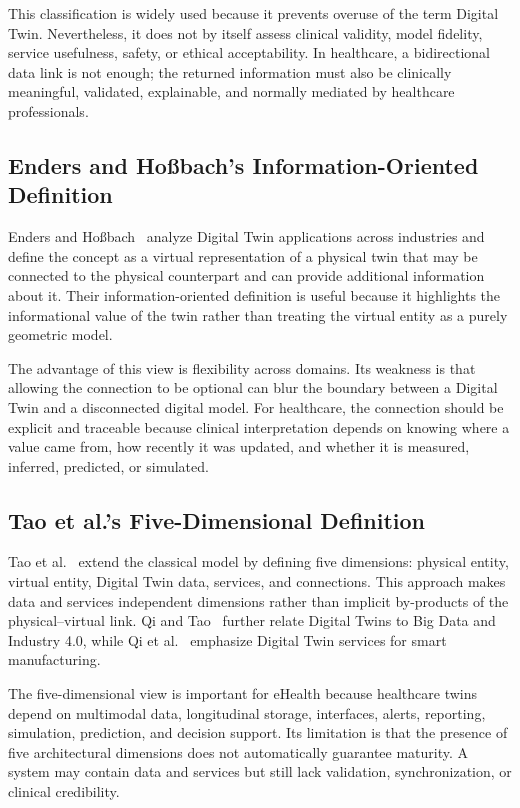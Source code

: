This classification is widely used because it prevents overuse of the term Digital Twin. Nevertheless, it does not by itself assess clinical validity, model fidelity, service usefulness, safety, or ethical acceptability. In healthcare, a bidirectional data link is not enough; the returned information must also be clinically meaningful, validated, explainable, and normally mediated by healthcare professionals.

\subsection{Enders and Ho{\ss}bach's Information-Oriented Definition}
Enders and Ho{\ss}bach~\cite{enders2019dimensions} analyze Digital Twin applications across industries and define the concept as a virtual representation of a physical twin that may be connected to the physical counterpart and can provide additional information about it. Their information-oriented definition is useful because it highlights the informational value of the twin rather than treating the virtual entity as a purely geometric model.

The advantage of this view is flexibility across domains. Its weakness is that allowing the connection to be optional can blur the boundary between a Digital Twin and a disconnected digital model. For healthcare, the connection should be explicit and traceable because clinical interpretation depends on knowing where a value came from, how recently it was updated, and whether it is measured, inferred, predicted, or simulated.

\subsection{Tao et al.'s Five-Dimensional Definition}
Tao et al.~\cite{tao2018digitalTwinDriven,tao2019digital} extend the classical model by defining five dimensions: physical entity, virtual entity, Digital Twin data, services, and connections. This approach makes data and services independent dimensions rather than implicit by-products of the physical--virtual link. Qi and Tao~\cite{qi2018digital} further relate Digital Twins to Big Data and Industry 4.0, while Qi et al.~\cite{qi2018service} emphasize Digital Twin services for smart manufacturing.

The five-dimensional view is important for eHealth because healthcare twins depend on multimodal data, longitudinal storage, interfaces, alerts, reporting, simulation, prediction, and decision support. Its limitation is that the presence of five architectural dimensions does not automatically guarantee maturity. A system may contain data and services but still lack validation, synchronization, or clinical credibility.

